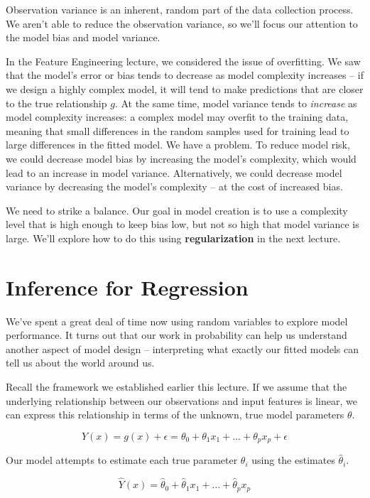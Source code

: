 \documentclass[
  letterpaper,
  DIV=11,
  numbers=noendperiod]{scrreprt}
\begin{document}
Observation variance is an inherent, random part of the data collection
process. We aren't able to reduce the observation variance, so we'll
focus our attention to the model bias and model variance.

In the Feature Engineering lecture, we considered the issue of
overfitting. We saw that the model's error or bias tends to decrease as
model complexity increases -- if we design a highly complex model, it
will tend to make predictions that are closer to the true relationship
\(g\). At the same time, model variance tends to \emph{increase} as
model complexity increases: a complex model may overfit to the training
data, meaning that small differences in the random samples used for
training lead to large differences in the fitted model. We have a
problem. To reduce model risk, we could decrease model bias by
increasing the model's complexity, which would lead to an increase in
model variance. Alternatively, we could decrease model variance by
decreasing the model's complexity -- at the cost of increased bias.

We need to strike a balance. Our goal in model creation is to use a
complexity level that is high enough to keep bias low, but not so high
that model variance is large. We'll explore how to do this using
\textbf{regularization} in the next lecture.

\hypertarget{inference-for-regression}{%
\section{Inference for Regression}\label{inference-for-regression}}

We've spent a great deal of time now using random variables to explore
model performance. It turns out that our work in probability can help us
understand another aspect of model design -- interpreting what exactly
our fitted models can tell us about the world around us.

Recall the framework we established earlier this lecture. If we assume
that the underlying relationship between our observations and input
features is linear, we can express this relationship in terms of the
unknown, true model parameters \(\theta\).

\[Y(x) = g(x) + \epsilon = \theta_0 + \theta_1 x_1 + \ldots + \theta_p x_p + \epsilon\]

Our model attempts to estimate each true parameter \(\theta_i\) using
the estimates \(\hat{\theta}_i\).

\[\hat{Y}(x) = \hat{\theta}_0 + \hat{\theta}_1 x_1 + \ldots + \hat{\theta}_p x_p\]
\end{document}
